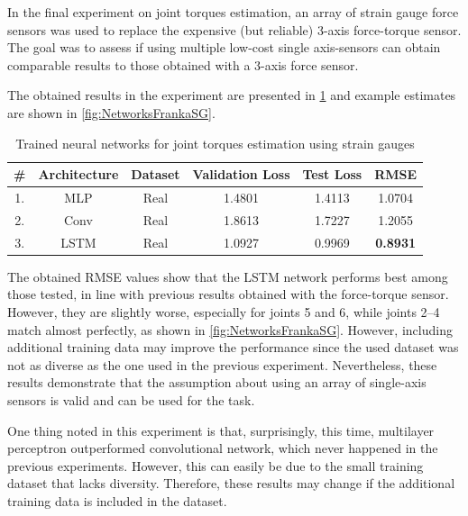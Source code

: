 In the final experiment on joint torques estimation, an array of strain gauge force sensors was used to replace the expensive (but reliable) 3-axis force-torque sensor. The goal was to assess if using multiple low-cost single axis-sensors can obtain comparable results to those obtained with a 3-axis force sensor. 

The obtained results in the experiment are presented in \cref{tab:NetworksFrankaTorqueSG} and example estimates are shown in \cref{fig:NetworksFrankaSG}. 

\begin{table}
    \centering
    \caption{Trained neural networks for joint torques estimation using strain gauges}
    \label{tab:NetworksFrankaTorqueSG}
    \begin{tabular}{cccccc}
        \toprule
        \textbf{\#} & \textbf{Architecture} & \textbf{Dataset} & \textbf{Validation Loss} & \textbf{Test Loss} & \textbf{RMSE} \\
        \midrule
        1. & MLP & Real & 1.4801 & 1.4113 & 1.0704\\%
        2. & Conv & Real & 1.8613 & 1.7227 & 1.2055\\ %
        3. & LSTM & Real & 1.0927 & 0.9969 &\textbf{0.8931}\\ %
        \bottomrule
    \end{tabular}
\end{table}

The obtained RMSE values show that the LSTM network performs best among those tested, in line with previous results obtained with the force-torque sensor. However, they are slightly worse, especially for joints 5 and 6, while joints 2--4 match almost perfectly, as shown in \ref{fig:NetworksFrankaSG}. However, including additional training data may improve the performance since the used dataset was not as diverse as the one used in the previous experiment. Nevertheless, these results demonstrate that the assumption about using an array of single-axis sensors is valid and can be used for the task. 

One thing noted in this experiment is that, surprisingly, this time, multilayer perceptron outperformed convolutional network, which never happened in the previous experiments. However, this can easily be due to the small training dataset that lacks diversity. Therefore, these results may change if the additional training data is included in the dataset.

